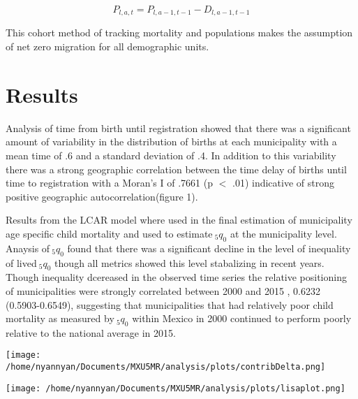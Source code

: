 \documentclass[a0,portrait]{a0poster}
\begin{document}
\begin{multicols}{2}
$$
P_{l,a,t} = P_{l,a-1,t-1} - D_{l,a-1,t-1}
$$

This cohort method of tracking mortality and populations makes the assumption of net zero migration for all demographic units.


\section*{Results}

Analysis of time from birth until registration showed that there was a significant amount of variability in the distribution of births at each municipality with a mean time of .6  and a standard deviation of .4. In addition to this variability there was a strong geographic correlation between the time delay of births until time to registration with a Moran's I of .7661 (p $<$ .01) indicative of strong positive geographic autocorrelation(figure 1).

Results from the LCAR model where used in the final estimation of municipality age specific child mortality and used to estimate$~_{5}q_{0}$ at the municipality level. Anaysis of$~_{5}q_{0}$ found that there was a significant decline in the level of inequality of lived$~_{5}q_{0}$ though all metrics showed this level stabalizing in recent years. Though inequality dcereased in the observed time series the relative positioning of municipalities were strongly correlated between 2000 and 2015 , 0.6232 (0.5903-0.6549), suggesting that municipalities that had relatively poor child mortality as measured by$~_{5}q_{0}$ within Mexico in 2000 continued to perform poorly relative to the national average in 2015.

%
\begin{center}\vspace{1cm}
\texttt{[image: /home/nyannyan/Documents/MXU5MR/analysis/plots/contribDelta.png]}
\end{center}\vspace{1cm}
%

%
\begin{center}\vspace{1cm}
\texttt{[image: /home/nyannyan/Documents/MXU5MR/analysis/plots/lisaplot.png]}
\end{center}\vspace{1cm}
%


\end{multicols}
\end{document}
